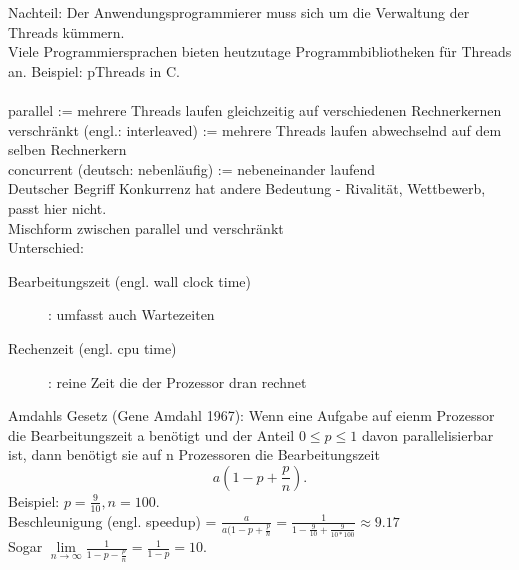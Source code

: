 \documentclass[a4paper,12pt]{scrartcl}
\begin{document}
Nachteil: Der Anwendungsprogrammierer muss sich um die Verwaltung der Threads kümmern.\\
Viele Programmiersprachen bieten heutzutage Programmbibliotheken für Threads an. Beispiel: pThreads in C.\\
\\
parallel := mehrere Threads laufen gleichzeitig auf verschiedenen Rechnerkernen\\
verschränkt (engl.: interleaved) := mehrere Threads laufen abwechselnd auf dem selben Rechnerkern\\
concurrent (deutsch: \glqq{}nebenläufig\grqq{}) := nebeneinander laufend \\
Deutscher Begriff \glqq{}Konkurrenz\grqq{} hat andere Bedeutung - Rivalität, Wettbewerb, passt hier nicht.\\
Mischform zwischen parallel und verschränkt\\
Unterschied: 
\begin{description}
 \item[Bearbeitungszeit (engl. wall clock time)]: umfasst auch Wartezeiten
 \item[Rechenzeit (engl. cpu time)]: reine Zeit die der Prozessor dran rechnet
\end{description}

Amdahls Gesetz (Gene Amdahl 1967): Wenn eine Aufgabe auf eienm Prozessor die Bearbeitungszeit a benötigt und der Anteil $0\leq p\leq1$ davon parallelisierbar ist, dann benötigt sie auf n Prozessoren die Bearbeitungszeit
$$a(1-p+\frac{p}{n})\text{.}$$
Beispiel: $p=\frac{9}{10}, n=100$.\\
Beschleunigung (engl. speedup) = $\frac{a}{a(1-p+\frac{p}{n}} = \frac{1}{1-\frac{9}{10}+\frac{9}{10*100}} \approx 9.17$\\
Sogar $\underset{n\rightarrow\infty}{\lim }\frac{1}{1-p-\frac{p}{n}} = \frac{1}{1-p} = 10$.
\end{document}
